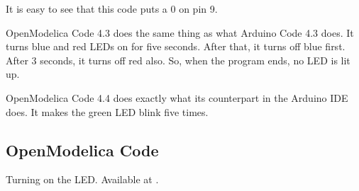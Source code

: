 It is easy to see that this code puts a 0 on pin 9.

OpenModelica Code 4.3 does the same thing as what Arduino Code 4.3 does. It turns
blue and red LEDs on for five seconds. After that, it turns off blue first. After
3 seconds, it turns off red also. So, when the program ends, no LED is lit up.

OpenModelica Code 4.4 does exactly what its counterpart in the Arduino IDE does.
It makes the green LED blink five times. 

\subsection{OpenModelica Code}
\lstset{style=mystyle}
\label{sec:led-OpenModelica-code}

\begin{OpenModelicacode}
{Turning on the LED.  Available at
  .}
\label{OpenModelica:led-blue}

\end{OpenModelicacode}

\begin{OpenModelicacode}
\label{OpenModelica:led-blue-delay}

\end{OpenModelicacode}

\begin{OpenModelicacode}
\label{OpenModelica:led-blue-red}

\end{OpenModelicacode}

\begin{OpenModelicacode}
\label{OpenModelica:led-green-blink}

\end{OpenModelicacode}

